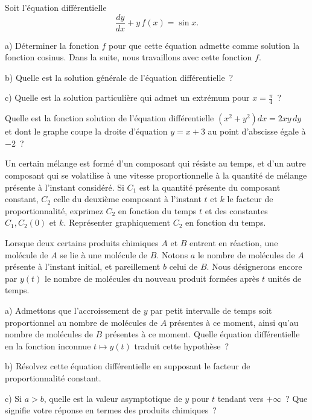 \documentclass[12pt,french,oneside,a4paper]{memoir} %
\begin{document}
\begin{exo}
Soit l'équation différentielle
\begin{equation*}
\frac{dy}{dx}+y\,f(x)=\sin x.
\end{equation*}

a) Déterminer la fonction $f$ pour que cette équation admette
comme solution la fonction cosinus. Dans la suite, nous travaillons
avec cette fonction $f$.

b) Quelle est la solution générale de l'équation
différentielle~?

c) Quelle est la solution particulière qui admet un extrémum
pour $\displaystyle{x=\frac{\pi}{4}}$~?
\end{exo}
\begin{exo}
Quelle est la fonction solution de l'équation
différentielle $\displaystyle{(x^2+y^2)dx=2xy\,dy}$ et dont le
graphe coupe la droite d'équation $y=x+3$ au point d'abscisse
égale à $-2$~?
\end{exo}
\begin{exo}
Un certain mélange est formé d'un composant qui résiste
au temps, et d'un autre composant qui se volatilise à une vitesse
proportionnelle à la quantité de mélange présente à
l'instant considéré. Si $C_1$ est la quantité présente du
composant constant, $C_2$ celle du deuxième composant à
l'instant $t$ et $k$ le facteur de proportionnalité, exprimez
$C_2$ en fonction du temps $t$ et des constantes $C_1, C_2(0)$ et
$k$. Représenter graphiquement $C_2$ en fonction du temps.
\end{exo}
\begin{exo}
Lorsque deux certains produits chimiques $A$ et $B$ entrent en
réaction, une molécule de $A$ se lie à une molécule de $B$.
Notons $a$ le nombre de molécules de $A$ présente à l'instant
initial, et pareillement $b$ celui de $B$. Nous désignerons
encore par $y(t)$ le nombre de molécules du nouveau produit
formées après $t$ unités de temps.

a) Admettons que l'accroissement de $y$ par \og petit\fg{} intervalle de
temps soit proportionnel au nombre de molécules de $A$
présentes à ce moment, ainsi qu'au nombre de molécules de $B$
présentes à ce moment. Quelle équation différentielle en la
fonction inconnue $t\mapsto y(t)$ traduit cette hypothèse~?

b) Résolvez cette équation différentielle en supposant le
facteur de proportionnalité constant.

c) Si $a>b$, quelle est la valeur asymptotique de $y$ pour $t$
tendant vers $+\infty$~? Que signifie votre réponse en termes des
produits chimiques~?
\end{exo}
\end{document}
